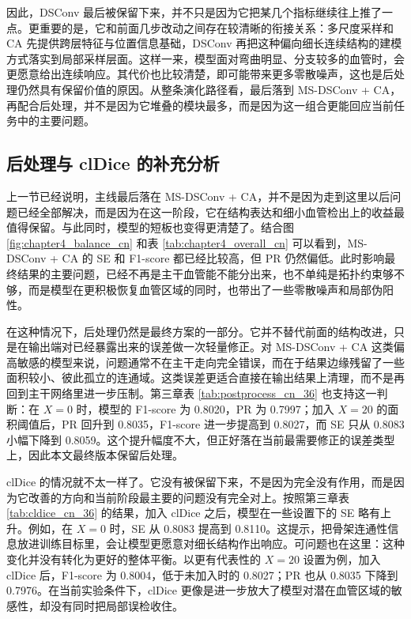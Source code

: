 \documentclass[a4paper,12pt]{article}
\begin{document}
因此，DSConv 最后被保留下来，并不只是因为它把某几个指标继续往上推了一点。更重要的是，它和前面几步改动之间存在较清晰的衔接关系：多尺度采样和 CA 先提供跨层特征与位置信息基础，DSConv 再把这种偏向细长连续结构的建模方式落实到局部采样层面。这样一来，模型面对弯曲明显、分支较多的血管时，会更愿意给出连续响应。其代价也比较清楚，即可能带来更多零散噪声，这也是后处理仍然具有保留价值的原因。从整条演化路径看，最后落到 MS-DSConv + CA，再配合后处理，并不是因为它堆叠的模块最多，而是因为这一组合更能回应当前任务中的主要问题。

\subsection{后处理与 clDice 的补充分析}

上一节已经说明，主线最后落在 MS-DSConv + CA，并不是因为走到这里以后问题已经全部解决，而是因为在这一阶段，它在结构表达和细小血管检出上的收益最值得保留。与此同时，模型的短板也变得更清楚了。结合图 \ref{fig:chapter4_balance_cn} 和表 \ref{tab:chapter4_overall_cn} 可以看到，MS-DSConv + CA 的 SE 和 F1-score 都已经比较高，但 PR 仍然偏低。此时影响最终结果的主要问题，已经不再是主干血管能不能分出来，也不单纯是拓扑约束够不够，而是模型在更积极恢复血管区域的同时，也带出了一些零散噪声和局部伪阳性。

在这种情况下，后处理仍然是最终方案的一部分。它并不替代前面的结构改进，只是在输出端对已经暴露出来的误差做一次轻量修正。对 MS-DSConv + CA 这类偏高敏感的模型来说，问题通常不在主干走向完全错误，而在于结果边缘残留了一些面积较小、彼此孤立的连通域。这类误差更适合直接在输出结果上清理，而不是再回到主干网络里进一步压制。第三章表 \ref{tab:postprocess_cn_36} 也支持这一判断：在 \(X=0\) 时，模型的 F1-score 为 0.8020，PR 为 0.7997；加入 \(X=20\) 的面积阈值后，PR 回升到 0.8035，F1-score 进一步提高到 0.8027，而 SE 只从 0.8083 小幅下降到 0.8059。这个提升幅度不大，但正好落在当前最需要修正的误差类型上，因此本文最终版本保留后处理。

clDice 的情况就不太一样了。它没有被保留下来，不是因为完全没有作用，而是因为它改善的方向和当前阶段最主要的问题没有完全对上。按照第三章表 \ref{tab:cldice_cn_36} 的结果，加入 clDice 之后，模型在一些设置下的 SE 略有上升。例如，在 \(X=0\) 时，SE 从 0.8083 提高到 0.8110。这提示，把骨架连通性信息放进训练目标里，会让模型更愿意对细长结构作出响应。可问题也在这里：这种变化并没有转化为更好的整体平衡。以更有代表性的 \(X=20\) 设置为例，加入 clDice 后，F1-score 为 0.8004，低于未加入时的 0.8027；PR 也从 0.8035 下降到 0.7976。在当前实验条件下，clDice 更像是进一步放大了模型对潜在血管区域的敏感性，却没有同时把局部误检收住。
\end{document}
